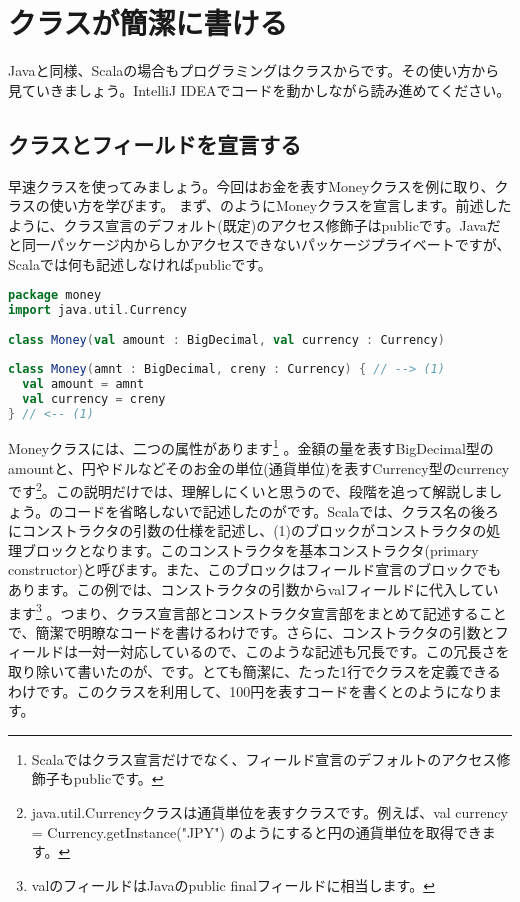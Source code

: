 \section{クラスが簡潔に書ける}
Javaと同様、Scalaの場合もプログラミングはクラスからです。その使い方から見ていきましょう。IntelliJ IDEAでコードを動かしながら読み進めてください。
\subsection{クラスとフィールドを宣言する}
早速クラスを使ってみましょう。今回はお金を表すMoneyクラスを例に取り、クラスの使い方を学びます。 まず、のようにMoneyクラスを宣言します。前述したように、クラス宣言のデフォルト(既定)のアクセス修飾子はpublicです。Javaだと同一パッケージ内からしかアクセスできないパッケージプライベートですが、Scalaでは何も記述しなければpublicです。

\begin{lstlisting}[language=scala, label=src:money, caption=Moneyクラス]
package money
import java.util.Currency
 
class Money(val amount : BigDecimal, val currency : Currency)
\end{lstlisting}

\begin{lstlisting}[language=scala, label=src:verbose_money, caption=Moneyクラス(省略しないで書いたもの)]
class Money(amnt : BigDecimal, creny : Currency) { // --> (1)
  val amount = amnt
  val currency = creny
} // <-- (1)
\end{lstlisting}

Moneyクラスには、二つの属性があります\footnote{Scalaではクラス宣言だけでなく、フィールド宣言のデフォルトのアクセス修飾子もpublicです。} 。金額の量を表すBigDecimal型のamountと、円やドルなどそのお金の単位(通貨単位)を表すCurrency型のcurrencyです\footnote{java.util.Currencyクラスは通貨単位を表すクラスです。例えば、val currency = Currency.getInstance("JPY") のようにすると円の通貨単位を取得できます。}。この説明だけでは、理解しにくいと思うので、段階を追って解説しましょう。のコードを省略しないで記述したのがです。Scalaでは、クラス名の後ろにコンストラクタの引数の仕様を記述し、(1)のブロックがコンストラクタの処理ブロックとなります。このコンストラクタを基本コンストラクタ(primary constructor)と呼びます。また、このブロックはフィールド宣言のブロックでもあります。この例では、コンストラクタの引数からvalフィールドに代入しています\footnote{valのフィールドはJavaのpublic finalフィールドに相当します。} 。つまり、クラス宣言部とコンストラクタ宣言部をまとめて記述することで、簡潔で明瞭なコードを書けるわけです。さらに、コンストラクタの引数とフィールドは一対一対応しているので、このような記述も冗長です。この冗長さを取り除いて書いたのが、です。とても簡潔に、たった1行でクラスを定義できるわけです。このクラスを利用して、100円を表すコードを書くとのようになります。

